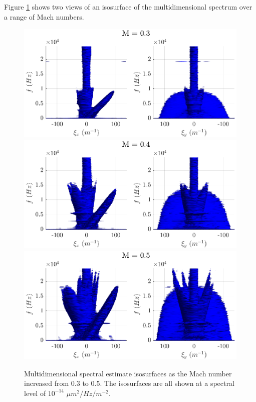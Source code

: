 Figure \ref{fig:04_dispersion_mach} shows two views of an isosurface of the multidimensional spectrum over a range of Mach numbers.
\begin{figure}
  \centering
  \includegraphics{../matlab/04_dispersion_analysis/dispersion_mach_0.3.eps}
  \includegraphics{../matlab/04_dispersion_analysis/dispersion_mach_0.4.eps}
  \includegraphics{../matlab/04_dispersion_analysis/dispersion_mach_0.5.eps}
  \caption{Multidimensional spectral estimate isosurfaces as the Mach number increased from 0.3 to 0.5. The isosurfaces are all shown at a spectral level of $10^{-14}$ $\mu m^2/Hz/m^{-2}$.}
  \label{fig:04_dispersion_mach}
\end{figure}

